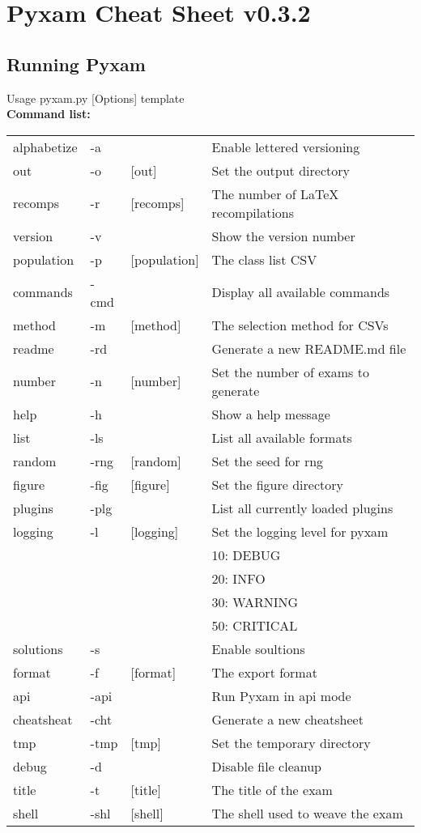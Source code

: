 \documentclass[9pt]{extarticle}
\begin{document}
\centering\section*{Pyxam Cheat Sheet v0.3.2}
\begin{multicols}{2}
\raggedright\subsection*{Running Pyxam}
Usage pyxam.py [Options] template \\
{\bf Command list:} \\
\begin{tabular}{l l l l}
alphabetize & -a &  & Enable lettered versioning\\
out & -o & [out] & Set the output directory\\
recomps & -r & [recomps] & The number of LaTeX recompilations\\
version & -v &  & Show the version number\\
population & -p & [population] & The class list CSV\\
commands & -cmd &  & Display all available commands\\
method & -m & [method] & The selection method for CSVs\\
readme & -rd &  & Generate a new README.md file\\
number & -n & [number] & Set the number of exams to generate\\
help & -h &  & Show a help message\\
list & -ls &  & List all available formats\\
random & -rng & [random] & Set the seed for rng\\
figure & -fig & [figure] & Set the figure directory\\
plugins & -plg &  & List all currently loaded plugins\\
logging & -l & [logging] & Set the logging level for pyxam\\
 & & & 10: DEBUG\\
 & & & 20: INFO\\
 & & & 30: WARNING\\
 & & & 50: CRITICAL\\
solutions & -s &  & Enable soultions\\
format & -f & [format] & The export format\\
api & -api &  & Run Pyxam in api mode\\
cheatsheat & -cht &  & Generate a new cheatsheet\\
tmp & -tmp & [tmp] & Set the temporary directory\\
debug & -d &  & Disable file cleanup\\
title & -t & [title] & The title of the exam\\
shell & -shl & [shell] & The shell used to weave the exam
\end{tabular} 


\end{multicols}
\end{document}
